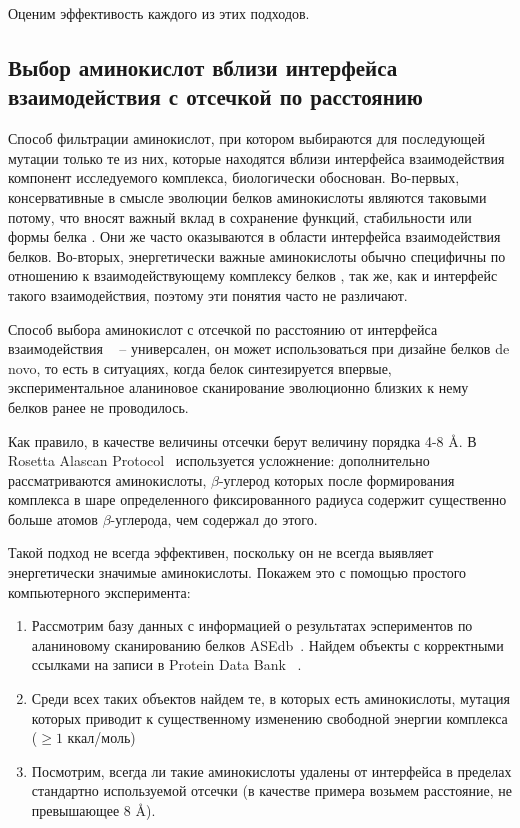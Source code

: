 Оценим эффективость каждого из этих подходов.

\subsection{Выбор аминокислот вблизи интерфейса взаимодействия с отсечкой по расстоянию}

Способ фильтрации аминокислот, при котором выбираются для последующей мутации только те из них, которые находятся вблизи интерфейса взаимодействия компонент исследуемого комплекса, биологически обоснован. Во-первых,  консервативные в смысле эволюции белков аминокислоты являются таковыми потому, что вносят важный вклад в сохранение функций, стабильности или формы белка \cite{toadd}. Они же часто оказываются в области интерфейса взаимодействия белков. Во-вторых, энергетически важные аминокислоты обычно специфичны по отношению к взаимодействующему комплексу белков \cite{toadd1}, так же, как и интерфейс такого взаимодействия, поэтому эти понятия часто не различают.

Способ выбора аминокислот с  отсечкой по расстоянию от интерфейса взаимодействия ~\cite{kortemme2004} -- универсален, он может использоваться при дизайне белков de novo, то есть в ситуациях, когда белок синтезируется впервые, экспериментальное аланиновое сканирование эволюционно близких к нему белков ранее не проводилось. 

Как правило, в качестве величины отсечки берут величину порядка  4-8 \AA{}. В  Rosetta Alascan Protocol~\cite{kortemme2004} используется усложнение: дополнительно рассматриваются аминокислоты, $\beta$-углерод которых после формирования комплекса в шаре определенного фиксированного радиуса содержит существенно больше атомов $\beta$-углерода, чем содержал до этого.

Такой подход не всегда эффективен, поскольку он не всегда выявляет энергетически значимые аминокислоты. Покажем это с помощью простого компьютерного эксперимента:
\begin{enumerate}
\item Рассмотрим базу данных с информацией о результатах эспериментов по аланиновому сканированию белков ASEdb~\cite{asedb2001}. Найдем объекты с корректными ссылками на записи в Protein Data Bank ~\cite{rcsb}.
\item Среди всех таких объектов найдем те, в которых есть аминокислоты, мутация которых приводит к существенному изменению свободной энергии комплекса ($\geq 1$ ккал/моль)
\item Посмотрим, всегда ли такие аминокислоты удалены от интерфейса в пределах стандартно используемой отсечки (в качестве примера возьмем расстояние, не превышающее 8 \AA{}).
\end{enumerate}

